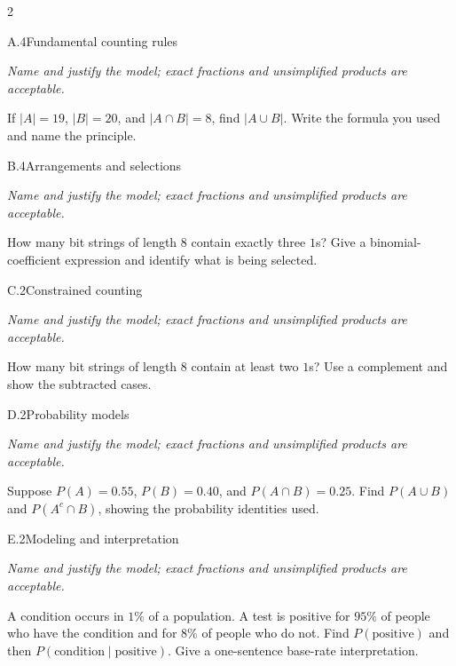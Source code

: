\documentclass[9pt]{extarticle}
\begin{document}
\begin{multicols}{2}
\begin{CoreProblem}{A.4}{Fundamental counting rules}
{\scriptsize\textit{Name and justify the model; exact fractions and unsimplified products are acceptable.}\par}
If $|A|=19$, $|B|=20$, and $|A\cap B|=8$, find $|A\cup B|$. Write
    the formula you used and name the principle.
\end{CoreProblem}
\begin{CoreProblem}{B.4}{Arrangements and selections}
{\scriptsize\textit{Name and justify the model; exact fractions and unsimplified products are acceptable.}\par}
How many bit strings of length 8 contain exactly three $1$s? Give a
    binomial-coefficient expression and identify what is being selected.
\end{CoreProblem}
\begin{CoreProblem}{C.2}{Constrained counting}
{\scriptsize\textit{Name and justify the model; exact fractions and unsimplified products are acceptable.}\par}
How many bit strings of length 8 contain at least two $1$s? Use a
    complement and show the subtracted cases.
\end{CoreProblem}
\columnbreak
\begin{CoreProblem}{D.2}{Probability models}
{\scriptsize\textit{Name and justify the model; exact fractions and unsimplified products are acceptable.}\par}
Suppose $P(A)=0.55$, $P(B)=0.40$, and $P(A\cap B)=0.25$. Find
    $P(A\cup B)$ and $P(A^c\cap B)$, showing the probability identities used.
\end{CoreProblem}
\begin{CoreProblem}{E.2}{Modeling and interpretation}
{\scriptsize\textit{Name and justify the model; exact fractions and unsimplified products are acceptable.}\par}
A condition occurs in $1\%$ of a population. A test is positive for
    $95\%$ of people who have the condition and for $8\%$ of people who do not.
    Find $P(\text{positive})$ and then
    $P(\text{condition}\mid\text{positive})$. Give a one-sentence base-rate
    interpretation.
\end{CoreProblem}
\end{multicols}
\CoreWorkArea
\FormBreak
{}
\end{document}
